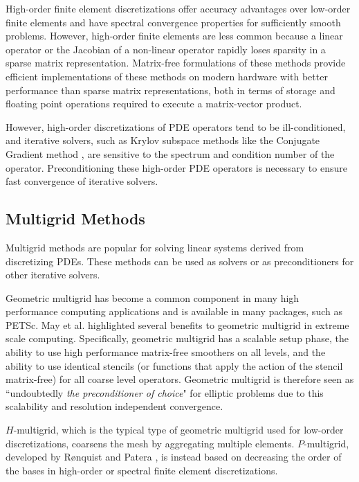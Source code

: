 High-order finite element discretizations offer accuracy advantages over low-order finite elements \cite{demkowicz1989toward, oden1989toward, rachowicz1989toward} and have spectral convergence properties for sufficiently smooth problems.
However, high-order finite elements are less common because a linear operator or the Jacobian of a non-linear operator rapidly loses sparsity in a sparse matrix representation.
Matrix-free formulations of these methods \cite{brown2010efficient, deville2002highorder, knoll2004jacobian} provide efficient implementations of these methods on modern hardware \cite{libceed-user-manual, fischer2020scalability, kronbichler2019multigrid} with better performance than sparse matrix representations, both in terms of storage and floating point operations required to execute a matrix-vector product.

However, high-order discretizations of PDE operators tend to be ill-conditioned, and iterative solvers, such as Krylov subspace methods like the Conjugate Gradient method \cite{hestenes1952methods, shewchuk1994introduction}, are sensitive to the spectrum and condition number of the operator.
Preconditioning these high-order PDE operators is necessary to ensure fast convergence of iterative solvers.

\subsection{Multigrid Methods}

Multigrid methods \cite{brandt1982guide, briggs2000multigrid, stuben1982multigrid} are popular for solving linear systems derived from discretizing PDEs.
These methods can be used as solvers or as preconditioners for other iterative solvers.

Geometric multigrid has become a common component in many high performance computing applications and is available in many packages, such as PETSc.
May et al. \cite{may2016extreme} highlighted several benefits to geometric multigrid in extreme scale computing.
Specifically, geometric multigrid has a scalable setup phase, the ability to use high performance matrix-free smoothers on all levels, and the ability to use identical stencils (or functions that apply the action of the stencil matrix-free) for all coarse level operators.
Geometric multigrid is therefore seen as ``undoubtedly {\textit{the preconditioner of choice}}" for elliptic problems due to this scalability and resolution independent convergence.

$H$-multigrid, which is the typical type of geometric multigrid used for low-order discretizations, coarsens the mesh by aggregating multiple elements.
$P$-multigrid, developed by R{\o}nquist and Patera \cite{ronquist1987spectral}, is instead based on decreasing the order of the bases in high-order or spectral finite element discretizations.

